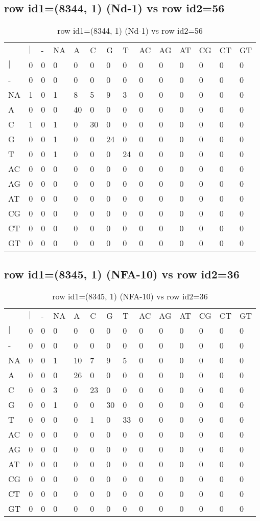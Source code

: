 \subsection{row id1=(8344, 1) (Nd-1) vs row id2=56}
\begin{center}
\begin{longtable}{|l|l|l|l|l|l|l|l|l|l|l|l|l|l|}
\caption{row id1=(8344, 1) (Nd-1) vs row id2=56} \label{table_dm360}\\
\hline
\\
\hline
&$|$&-&NA&A&C&G&T&AC&AG&AT&CG&CT&GT\\
$|$&0&0&0&0&0&0&0&0&0&0&0&0&0\\
-&0&0&0&0&0&0&0&0&0&0&0&0&0\\
NA&1&0&1&8&5&9&3&0&0&0&0&0&0\\
A&0&0&0&40&0&0&0&0&0&0&0&0&0\\
C&1&0&1&0&30&0&0&0&0&0&0&0&0\\
G&0&0&1&0&0&24&0&0&0&0&0&0&0\\
T&0&0&1&0&0&0&24&0&0&0&0&0&0\\
AC&0&0&0&0&0&0&0&0&0&0&0&0&0\\
AG&0&0&0&0&0&0&0&0&0&0&0&0&0\\
AT&0&0&0&0&0&0&0&0&0&0&0&0&0\\
CG&0&0&0&0&0&0&0&0&0&0&0&0&0\\
CT&0&0&0&0&0&0&0&0&0&0&0&0&0\\
GT&0&0&0&0&0&0&0&0&0&0&0&0&0\\
\hline
\end{longtable}
\end{center}

\subsection{row id1=(8345, 1) (NFA-10) vs row id2=36}
\begin{center}
\begin{longtable}{|l|l|l|l|l|l|l|l|l|l|l|l|l|l|}
\caption{row id1=(8345, 1) (NFA-10) vs row id2=36} \label{table_dm362}\\
\hline
\\
\hline
&$|$&-&NA&A&C&G&T&AC&AG&AT&CG&CT&GT\\
$|$&0&0&0&0&0&0&0&0&0&0&0&0&0\\
-&0&0&0&0&0&0&0&0&0&0&0&0&0\\
NA&0&0&1&10&7&9&5&0&0&0&0&0&0\\
A&0&0&0&26&0&0&0&0&0&0&0&0&0\\
C&0&0&3&0&23&0&0&0&0&0&0&0&0\\
G&0&0&1&0&0&30&0&0&0&0&0&0&0\\
T&0&0&0&0&1&0&33&0&0&0&0&0&0\\
AC&0&0&0&0&0&0&0&0&0&0&0&0&0\\
AG&0&0&0&0&0&0&0&0&0&0&0&0&0\\
AT&0&0&0&0&0&0&0&0&0&0&0&0&0\\
CG&0&0&0&0&0&0&0&0&0&0&0&0&0\\
CT&0&0&0&0&0&0&0&0&0&0&0&0&0\\
GT&0&0&0&0&0&0&0&0&0&0&0&0&0\\
\hline
\end{longtable}
\end{center}

